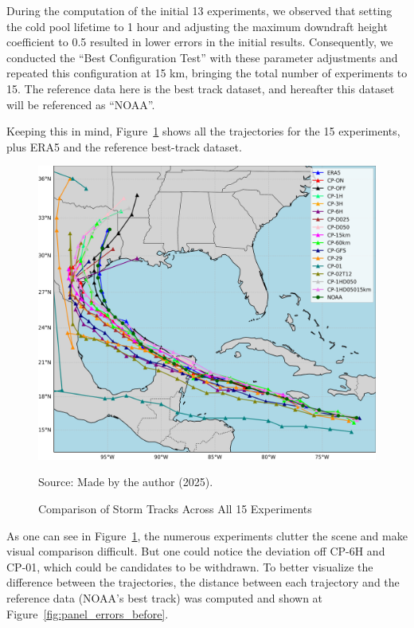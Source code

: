 During the computation of the initial 13 experiments, we observed that setting the cold pool lifetime to 1 hour and adjusting the maximum downdraft height coefficient to 0.5 resulted in lower errors in the initial results. Consequently, we conducted the “Best Configuration Test” with these parameter adjustments and repeated this configuration at 15 km, bringing the total number of experiments to 15. The reference data here is the best track dataset, and hereafter this dataset will be referenced as “NOAA”. 

Keeping this in mind, Figure~\ref{fig:all_tracks_before} shows all the trajectories for the 15 experiments, plus ERA5 and the reference best-track dataset.

\begin{figure}[!htb]
    \centering
    \caption{Comparison of Storm Tracks Across All 15 Experiments} %
    \includegraphics[width=\textwidth]{docs/figuras/findings/ALL_tracks.png} %
    \vspace{0.5em}
    
    Source: Made by the author (2025). %
    \label{fig:all_tracks_before} %
\end{figure}

As one can see in Figure~\ref{fig:all_tracks_before}, the numerous experiments clutter the scene and make visual comparison difficult. But one could notice the deviation off CP-6H and CP-01, which could be candidates to be withdrawn. To better visualize the difference between the trajectories, the distance between each trajectory and the reference data (NOAA’s best track) was computed and shown at Figure~\ref{fig:panel_errors_before}.

